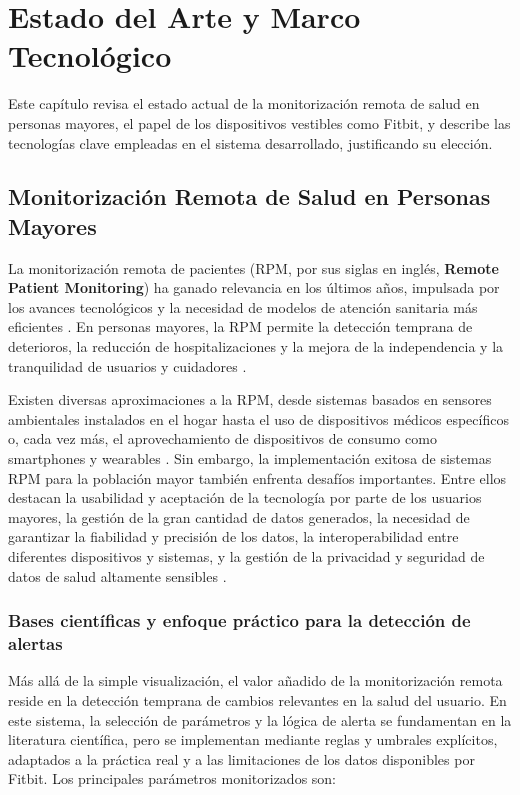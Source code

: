 \chapter{Estado del Arte y Marco Tecnológico}
\label{chap:estado_arte}

Este capítulo revisa el estado actual de la monitorización remota de salud en personas mayores, el papel de los dispositivos vestibles como Fitbit\textsuperscript{\textregistered}, y describe las tecnologías clave empleadas en el sistema desarrollado, justificando su elección.

\section{Monitorización Remota de Salud en Personas Mayores}
\label{sec:ea_monitorizacion_remota}

La monitorización remota de pacientes (RPM, por sus siglas en inglés, \textbf{Remote Patient Monitoring}) ha ganado relevancia en los últimos años, impulsada por los avances tecnológicos y la necesidad de modelos de atención sanitaria más eficientes \cite{noah2022mobile}. En personas mayores, la RPM permite la detección temprana de deterioros, la reducción de hospitalizaciones y la mejora de la independencia y la tranquilidad de usuarios y cuidadores \cite{bashshur2018telemedicine}.

Existen diversas aproximaciones a la RPM, desde sistemas basados en sensores ambientales instalados en el hogar hasta el uso de dispositivos médicos específicos o, cada vez más, el aprovechamiento de dispositivos de consumo como smartphones y wearables \cite{majumder2017wearable}. Sin embargo, la implementación exitosa de sistemas RPM para la población mayor también enfrenta desafíos importantes. Entre ellos destacan la usabilidad y aceptación de la tecnología por parte de los usuarios mayores, la gestión de la gran cantidad de datos generados, la necesidad de garantizar la fiabilidad y precisión de los datos, la interoperabilidad entre diferentes dispositivos y sistemas, y la gestión de la privacidad y seguridad de datos de salud altamente sensibles \cite{lee2021challenges}.

\subsection{Bases científicas y enfoque práctico para la detección de alertas}
\label{subsec:bases_alertas}

Más allá de la simple visualización, el valor añadido de la monitorización remota reside en la detección temprana de cambios relevantes en la salud del usuario. En este sistema, la selección de parámetros y la lógica de alerta se fundamentan en la literatura científica, pero se implementan mediante reglas y umbrales explícitos, adaptados a la práctica real y a las limitaciones de los datos disponibles por Fitbit. Los principales parámetros monitorizados son:

